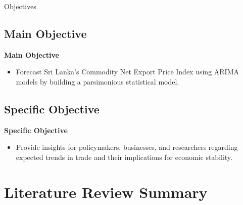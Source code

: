 \documentclass[11pt]{beamer}
\begin{document}
	\begin{frame}{Objectives}
		\subsection*{Main Objective}
		\textbf{Main Objective}
		\begin{itemize}
			\item Forecast Sri Lanka’s Commodity Net Export Price Index using ARIMA models 
			by building a parsimonious statistical model.
		\end{itemize}
		
		\vspace{0.5cm}
		
		\subsection*{Specific Objective}
		\textbf{Specific Objective}
		\begin{itemize}
			\item Provide insights for policymakers, businesses, and researchers 
			regarding expected trends in trade and their implications for 
			economic stability.
		\end{itemize}
	\end{frame}
	
	
	\section{Literature Review Summary}
	
\end{document}
